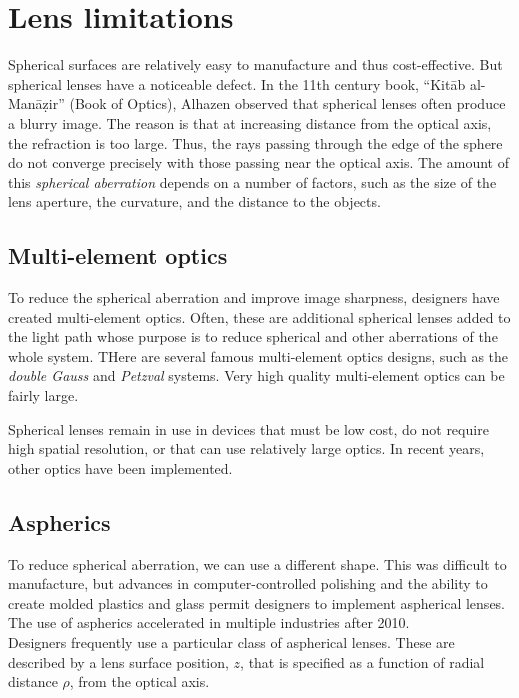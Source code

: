 \documentclass[
  letterpaper,
]{book}
\begin{document}
\section{Lens limitations}\label{lens-limitations}

Spherical surfaces are relatively easy to manufacture and thus
cost-effective. But spherical lenses have a noticeable defect. In the
11th century book, ``Kitāb al-Manāẓir'' (Book of Optics), Alhazen
observed that spherical lenses often produce a blurry image. The reason
is that at increasing distance from the optical axis, the refraction is
too large. Thus, the rays passing through the edge of the sphere do not
converge precisely with those passing near the optical axis. The amount
of this \emph{spherical aberration} depends on a number of factors, such
as the size of the lens aperture, the curvature, and the distance to the
objects.

\subsection{Multi-element optics}\label{multi-element-optics}

To reduce the spherical aberration and improve image sharpness,
designers have created multi-element optics. Often, these are additional
spherical lenses added to the light path whose purpose is to reduce
spherical and other aberrations of the whole system. THere are several
famous multi-element optics designs, such as the \emph{double Gauss} and
\emph{Petzval} systems. Very high quality multi-element optics can be
fairly large.

Spherical lenses remain in use in devices that must be low cost, do not
require high spatial resolution, or that can use relatively large
optics. In recent years, other optics have been implemented.

\subsection{Aspherics}\label{aspherics}

To reduce spherical aberration, we can use a different shape. This was
difficult to manufacture, but advances in computer-controlled polishing
and the ability to create molded plastics and glass permit designers to
implement aspherical lenses. The use of aspherics accelerated in
multiple industries after 2010.\\

Designers frequently use a particular class of aspherical lenses. These
are described by a lens surface position, \(z\), that is specified as a
function of radial distance \(\rho\), from the optical axis.
\end{document}
